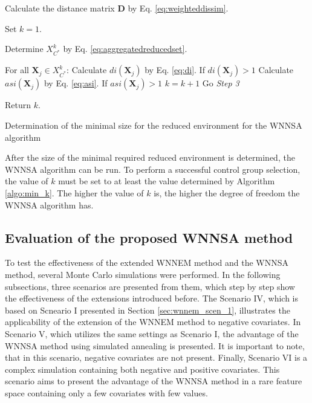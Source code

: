 		\begin{algorithm}
													
													
			Calculate the distance matrix $\textbf{D}$ by Eq. \ref{eq:weighteddissim}.
													
			Set $k=1$.
													
			Determine $X_{C^*}^k$ by Eq. \ref{eq:aggregatedreducedset}. 
													
			For all $\textbf{X}_j \in X_{C^*}^k$:
			\linebreak
			\text{\quad}
			Calculate $di(\textbf{X}_j)$ by Eq. \ref{eq:di}.
			\linebreak
			\text{\quad}
			If $di(\textbf{X}_j) > 1$
			\linebreak
			\text{\quad}\text{\quad}
			Calculate $asi(\textbf{X}_j)$ by Eq. \ref{eq:asi}.
			\linebreak
			\text{\quad}\text{\quad}
			If $asi(\textbf{X}_j) > 1$
			\linebreak
			\text{\quad}\text{\quad}\text{\quad}
			$k=k+1$
			\linebreak
			\text{\quad}\text{\quad}\text{\quad}
			Go \textit{Step 3}
												    
			Return $k$.
													
			\caption{Determination of the minimal size for the reduced environment for the WNNSA algorithm}
			\label{algo:min_k}
		\end{algorithm}
								
		After the size of the minimal required reduced environment is determined, the WNNSA algorithm can be run. To perform a successful control group selection, the value of $k$ must be set to at least the value determined by Algorithm \ref{algo:min_k}. The higher the value of $k$ is, the higher the degree of freedom the WNNSA algorithm has.
		         
		\subsection{Evaluation of the proposed WNNSA method}
		\label{sec:eval_wnnsa}
								
		To test the effectiveness of the extended WNNEM method and the WNNSA method, several Monte Carlo simulations were performed. In the following subsections, three scenarios are presented from them, which step by step show the effectiveness of the extensions introduced before. The Scenario IV, which is based on Scneario I presented in Section \ref{sec:wnnem_scen_1}, illustrates the applicability of the extension of the WNNEM method to negative covariates. In Scenario V, which utilizes the same settings as Scenario I, the advantage of the WNNSA method using simulated annealing is presented. It is important to note, that in this scenario, negative covariates are not present. Finally, Scenario VI is a complex simulation containing both negative and positive covariates. This scenario aims to present the advantage of the WNNSA method in a rare feature space containing only a few covariates with few values.
					
